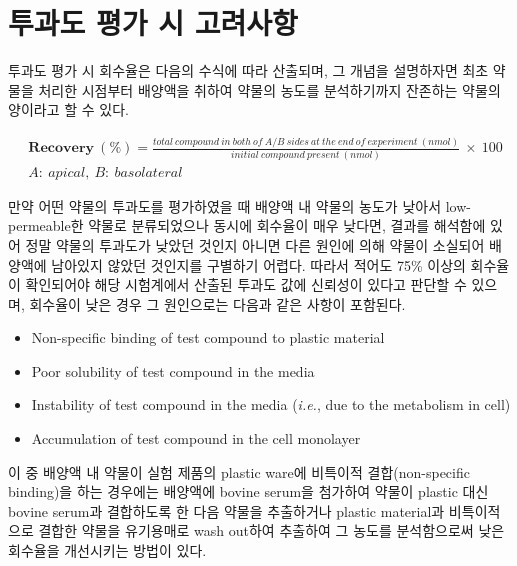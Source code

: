 \documentclass[
  11pt,
  krantz2, a4paper, twoside]{krantz}
\providecommand{\tightlist}{%
  \setlength{\itemsep}{0pt}\setlength{\parskip}{0pt}}
\begin{document}
\hypertarget{uxd22cuxacfcuxb3c4-uxd3c9uxac00-uxc2dc-uxace0uxb824uxc0acuxd56d}{%
\section{투과도 평가 시 고려사항}\label{uxd22cuxacfcuxb3c4-uxd3c9uxac00-uxc2dc-uxace0uxb824uxc0acuxd56d}}

투과도 평가 시 회수율은 다음의 수식에 따라 산출되며, 그 개념을
설명하자면 최초 약물을 처리한 시점부터 배양액을 취하여 약물의 농도를
분석하기까지 잔존하는 약물의 양이라고 할 수 있다.

\footnotesize

\begin{equation}
\begin{split}
&\mathbf{Recovery\ }(\mathbf{\%}) = \frac{total\ compound\ in\ both\ of\ A/B\ sides\ at\ the\ end\ of\ experiment\ (nmol)}{initial\ compound\ present\ (nmol)}\  \times \ 100 \\
&A:\ apical,\ B:\ basolateral
\end{split}
\label{eq:eq02-03}
\end{equation}

\normalsize

만약 어떤 약물의 투과도를 평가하였을 때 배양액 내 약물의 농도가 낮아서
low-permeable한 약물로 분류되었으나 동시에 회수율이 매우 낮다면, 결과를
해석함에 있어 정말 약물의 투과도가 낮았던 것인지 아니면 다른 원인에 의해
약물이 소실되어 배양액에 남아있지 않았던 것인지를 구별하기 어렵다.
따라서 적어도 75\% 이상의 회수율이 확인되어야 해당 시험계에서 산출된
투과도 값에 신뢰성이 있다고 판단할 수 있으며, 회수율이 낮은 경우 그
원인으로는 다음과 같은 사항이 포함된다.

\begin{itemize}
\tightlist
\item
  Non-specific binding of test compound to plastic material
\item
  Poor solubility of test compound in the media
\item
  Instability of test compound in the media (\emph{i.e.}, due to the
  metabolism in cell)
\item
  Accumulation of test compound in the cell monolayer
\end{itemize}

이 중 배양액 내 약물이 실험 제품의 plastic ware에 비특이적
결합(non-specific binding)을 하는 경우에는 배양액에 bovine serum을
첨가하여 약물이 plastic 대신 bovine serum과 결합하도록 한 다음 약물을
추출하거나 plastic material과 비특이적으로 결합한 약물을 유기용매로 wash
out하여 추출하여 그 농도를 분석함으로써 낮은 회수율을 개선시키는 방법이
있다.
\end{document}
